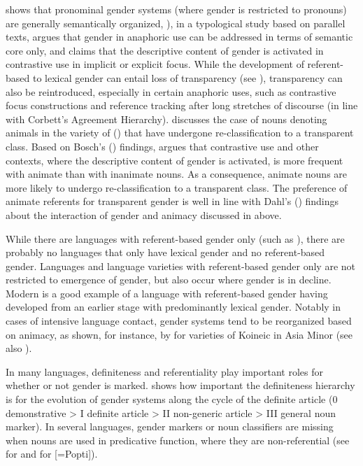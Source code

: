 \documentclass[output=collectionpaper]{langsci/langscibook}
\begin{document}
\cite{Audring2009a} shows that pronominal gender systems (where gender is restricted to pronouns) are generally semantically organized, ), in a typological study based on parallel texts, argues that gender in anaphoric use can be addressed in terms of semantic core only, and \cite[227]{Bosch1988} claims that the descriptive content of gender is activated in contrastive use in implicit or explicit focus. While the development of referent-based to lexical gender can entail loss of transparency (see ), transparency can also be reintroduced, especially in certain anaphoric uses, such as contrastive focus constructions and reference tracking after long stretches of discourse (in line with Corbett's Agreement Hierarchy). \cite[24]{Seifart2018} discusses the case of nouns denoting animals in the  variety of  () that have undergone re-classification to a transparent class. Based on Bosch's (\citealt*{Bosch1988}) findings, \cite{Seifart2018} argues that contrastive use and other contexts, where the descriptive content of gender is activated, is more frequent with animate than with inanimate nouns. As a consequence, animate nouns are more likely to undergo re-classification to a transparent class. The preference of animate referents for transparent gender is well in line with Dahl's (\citealt*{Dahl2000a}) findings about the interaction of gender and animacy discussed in  above.

While there are languages with referent-based gender only (such as ), there are probably no languages that only have lexical gender and no referent-based gender. Languages and language varieties with referent-based gender only are not restricted to emergence of gender, but also occur where gender is in decline. Modern  is a good example of a language with referent-based gender having developed from an earlier stage with predominantly lexical gender. Notably in cases of intensive language contact, gender systems tend to be reorganized based on animacy, as shown, for instance, by \cite{Karatsareas2014} for varieties of Koineic  in Asia Minor (see also ).

In many languages, definiteness and referentiality play important roles for whether or not gender is marked. \cite{Greenberg1978} shows how important the definiteness hierarchy is for the evolution of gender systems along the cycle of the definite article (0 demonstrative > I definite article > II non-generic article > III general noun marker). In several languages, gender markers or noun classifiers are missing when nouns are used in predicative function, where they are non-referential (see \citealt[110--111]{Fedden2011} for  and \citealt[330]{Craig1977} for  [=Popti\textquotesingle{}]).
\end{document}
